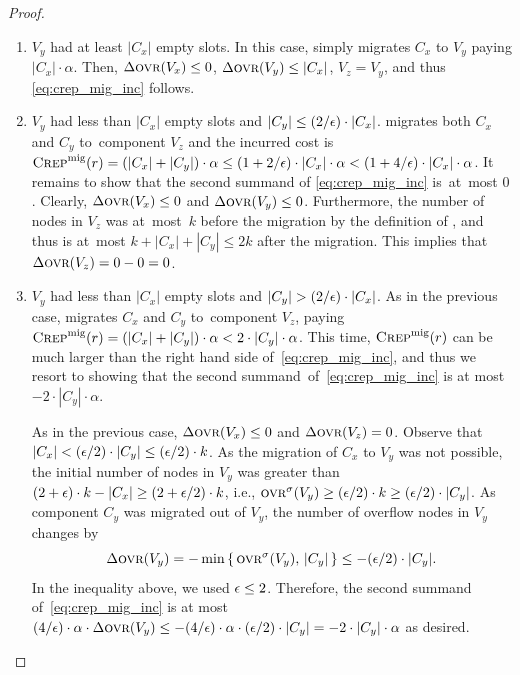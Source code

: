 \begin{proof}
\begin{enumerate}
\item 
$V_y$ had at least $|C_x|$ empty slots. In this case, \CREP simply migrates
$C_x$ to $V_y$ paying $|C_x| \cdot \alpha$. Then, $\Delta \textsc{ovr}(V_x) \leq 0$,
$\Delta \textsc{ovr}(V_y) \leq |C_x|$, $V_z = V_y$, and thus \eqref{eq:crep_mig_inc}
follows.

\item 
$V_y$ had less than $|C_x|$ empty slots and $|C_y| \leq (2/\epsilon) \cdot |C_x|$.
\CREP migrates both $C_x$ and $C_y$ to~component $V_z$ and the incurred cost is 
$\textsc{Crep}^\textnormal{mig}(r) = (|C_x| + |C_y|) \cdot \alpha \leq (1+2/\epsilon) \cdot |C_x| \cdot \alpha
< (1 + 4/\epsilon) \cdot |C_x| \cdot \alpha$. 
It remains to show that the second summand of \eqref{eq:crep_mig_inc} is~at~most $0$. 
Clearly, $\Delta \textsc{ovr}(V_x) \leq 0$ and $\Delta \textsc{ovr}(V_y) \leq 0$. 
Furthermore, the number of 
nodes in $V_z$ was at~most~$k$ before the migration by the definition of \CREP,
and thus is at~most $k + |C_x| + |C_y| \leq 2k$ after the migration.
This implies that $\Delta \textsc{ovr}(V_z) = 0 - 0 = 0$.

\item 
$V_y$ had less than $|C_x|$ empty slots and $|C_y| > (2/\epsilon) \cdot |C_x|$.
As in the previous case, \CREP migrates $C_x$ and $C_y$ to~component $V_z$, 
paying $\textsc{Crep}^\textnormal{mig}(r) = (|C_x| + |C_y|) \cdot \alpha < 2 \cdot |C_y| \cdot \alpha$.
This time, $\textsc{Crep}^\textnormal{mig}(r)$ can be much larger than the right hand side 
of~\eqref{eq:crep_mig_inc}, and thus we resort to showing that 
the second summand~of~\eqref{eq:crep_mig_inc} is at most $ - 2 \cdot |C_y| \cdot \alpha$.

As in the previous case, $\Delta \textsc{ovr}(V_x) \leq 0$ and $\Delta \textsc{ovr}(V_z) = 0$. 
Observe that $|C_x| < (\epsilon / 2) \cdot |C_y| \leq (\epsilon / 2) \cdot k$.
As the migration of $C_x$ to $V_y$ was not possible, the initial number
of nodes in $V_y$ was greater than $(2 + \epsilon) \cdot k - |C_x| \geq (2+\epsilon/2) \cdot k$,
i.e., $\textsc{ovr}^\sigma(V_y) \geq (\epsilon/2) \cdot k \geq (\epsilon/2) \cdot |C_y|$. 
As component $C_y$ was migrated out of $V_y$, the number of overflow nodes in $V_y$ changes by
\[
	\Delta \textsc{ovr}(V_y) 
		= - \min \left\{ \,\textsc{ovr}^\sigma(V_y), \,|C_y| \,\right\}
		\leq - (\epsilon/2) \cdot |C_y|.
\]
In the inequality above, we used $\epsilon \leq 2$.
Therefore, the second summand of~\eqref{eq:crep_mig_inc} is at most 
$(4/\epsilon) \cdot \alpha \cdot \Delta\textsc{ovr}(V_y) \leq - 
(4/\epsilon) \cdot \alpha \cdot (\epsilon/2) \cdot |C_y|
= - 2 \cdot |C_y| \cdot \alpha$ as desired.
\end{enumerate}
\end{proof}

